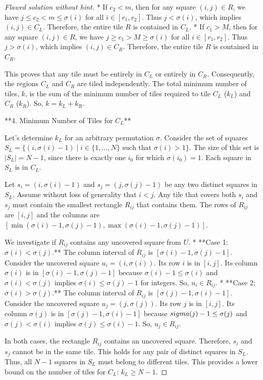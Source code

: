 \begin{proof} [Flawed solution without hint]
*   If $c_2 < m$, then for any square $(i,j) \in R$, we have $j \le c_2 < m \le \sigma(i)$ for all $i \in [r_1, r_2]$. Thus $j < \sigma(i)$, which implies $(i,j) \in C_L$. Therefore, the entire tile $R$ is contained in $C_L$.
*   If $c_1 > M$, then for any square $(i,j) \in R$, we have $j \ge c_1 > M \ge \sigma(i)$ for all $i \in [r_1, r_2]$. Thus $j > \sigma(i)$, which implies $(i,j) \in C_R$. Therefore, the entire tile $R$ is contained in $C_R$.

This proves that any tile must be entirely in $C_L$ or entirely in $C_R$. Consequently, the regions $C_L$ and $C_R$ are tiled independently. The total minimum number of tiles, $k$, is the sum of the minimum number of tiles required to tile $C_L$ ($k_L$) and $C_R$ ($k_R$). So, $k = k_L + k_R$.

**4. Minimum Number of Tiles for $C_L$**

Let's determine $k_L$ for an arbitrary permutation $\sigma$.
Consider the set of squares $S_L = \{(i, \sigma(i)-1) \mid i \in \{1, \dots, N\} \text{ such that } \sigma(i) > 1\}$.
The size of this set is $|S_L| = N-1$, since there is exactly one $i_0$ for which $\sigma(i_0)=1$. Each square in $S_L$ is in $C_L$.

Let $s_i = (i, \sigma(i)-1)$ and $s_j = (j, \sigma(j)-1)$ be any two distinct squares in $S_L$. Assume without loss of generality that $i < j$. Any tile that covers both $s_i$ and $s_j$ must contain the smallest rectangle $R_{ij}$ that contains them. The rows of $R_{ij}$ are $[i,j]$ and the columns are $[\min(\sigma(i)-1, \sigma(j)-1), \max(\sigma(i)-1, \sigma(j)-1)]$.

We investigate if $R_{ij}$ contains any uncovered square from $U$.
*   **Case 1: $\sigma(i) < \sigma(j)$.** The column interval of $R_{ij}$ is $[\sigma(i)-1, \sigma(j)-1]$. Consider the uncovered square $u_i = (i, \sigma(i))$. Its row $i$ is in $[i,j]$. Its column $\sigma(i)$ is in $[\sigma(i)-1, \sigma(j)-1]$ because $\sigma(i)-1 \le \sigma(i)$ and $\sigma(i) < \sigma(j)$ implies $\sigma(i) \le \sigma(j)-1$ for integers. So, $u_i \in R_{ij}$.
*   **Case 2: $\sigma(i) > \sigma(j)$.** The column interval of $R_{ij}$ is $[\sigma(j)-1, \sigma(i)-1]$. Consider the uncovered square $u_j = (j, \sigma(j))$. Its row $j$ is in $[i,j]$. Its column $\sigma(j)$ is in $[\sigma(j)-1, \sigma(i)-1]$ because $\\sigma(j)-1 \le \sigma(j)$ and $\sigma(j) < \sigma(i)$ implies $\sigma(j) \le \sigma(i)-1$. So, $u_j \in R_{ij}$.

In both cases, the rectangle $R_{ij}$ contains an uncovered square. Therefore, $s_i$ and $s_j$ cannot be in the same tile. This holds for any pair of distinct squares in $S_L$. Thus, all $N-1$ squares in $S_L$ must belong to different tiles. This provides a lower bound on the number of tiles for $C_L$: $k_L \ge N-1$.


\end{proof}
